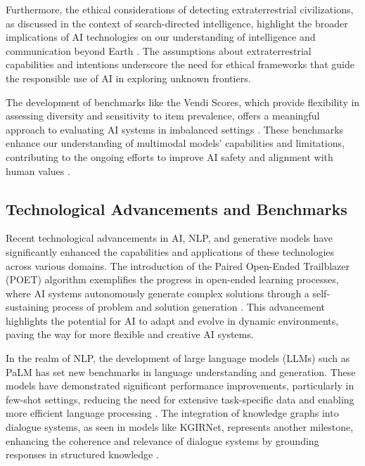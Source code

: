 Furthermore, the ethical considerations of detecting extraterrestrial civilizations, as discussed in the context of search-directed intelligence, highlight the broader implications of AI technologies on our understanding of intelligence and communication beyond Earth \cite{lubin2016searchdirectedintelligence}. The assumptions about extraterrestrial capabilities and intentions underscore the need for ethical frameworks that guide the responsible use of AI in exploring unknown frontiers.



The development of benchmarks like the Vendi Scores, which provide flexibility in assessing diversity and sensitivity to item prevalence, offers a meaningful approach to evaluating AI systems in imbalanced settings \cite{pasarkar2024cousinsvendiscorefamily}. These benchmarks enhance our understanding of multimodal models' capabilities and limitations, contributing to the ongoing efforts to improve AI safety and alignment with human values \cite{liu2024visual}.






\subsection{Technological Advancements and Benchmarks} \label{subsec:Technological Advancements and Benchmarks}



Recent technological advancements in AI, NLP, and generative models have significantly enhanced the capabilities and applications of these technologies across various domains. The introduction of the Paired Open-Ended Trailblazer (POET) algorithm exemplifies the progress in open-ended learning processes, where AI systems autonomously generate complex solutions through a self-sustaining process of problem and solution generation \cite{wang2019pairedopenendedtrailblazerpoet}. This advancement highlights the potential for AI to adapt and evolve in dynamic environments, paving the way for more flexible and creative AI systems.

In the realm of NLP, the development of large language models (LLMs) such as PaLM has set new benchmarks in language understanding and generation. These models have demonstrated significant performance improvements, particularly in few-shot settings, reducing the need for extensive task-specific data and enabling more efficient language processing \cite{chowdhery2023palm}. The integration of knowledge graphs into dialogue systems, as seen in models like KGIRNet, represents another milestone, enhancing the coherence and relevance of dialogue systems by grounding responses in structured knowledge \cite{chaudhuri2021groundingdialoguesystemsknowledge}.

